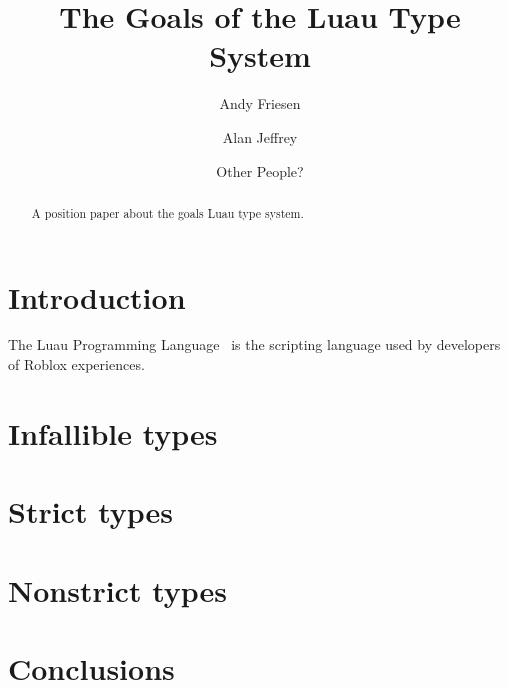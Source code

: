 \documentclass[acmsmall]{acmart}
\begin{document}
\title{The Goals of the Luau Type System}

\author{Andy Friesen}
\author{Alan Jeffrey}
\author{Other People?}

\begin{abstract}
  A position paper about the goals Luau type system.
\end{abstract}

\maketitle

\section{Introduction}

The Luau Programming Language~\cite{Luau}
is the scripting language used by developers of Roblox
experiences.

\section{Infallible types}
\section{Strict types}
\section{Nonstrict types}
\section{Conclusions}



\end{document}
